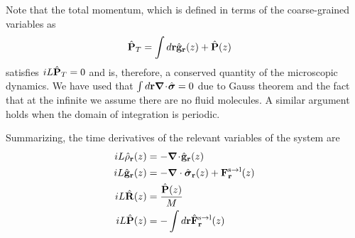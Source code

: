 \documentclass[b5paper,openright,11pt]{book}
\newcommand{\esc}{\!\cdot\!}
\begin{document}
Note  that the  total  momentum,  which is  defined  in  terms of  the
coarse-grained variables as
\begin{align}
  \hat{\bf P}_T&=\int d{\bf r} \hat{\bf g}_{\bf r}(z)+\hat{\bf P}(z)
\end{align}
satisfies $ iL\hat{\bf P}_T=0$ and is, therefore, a conserved quantity
of  the  microscopic   dynamics.   We  have  used   that  $\int  d{\bf
  r}\boldsymbol{\nabla}\esc\hat{\boldsymbol{\sigma}}=0$  due to  Gauss theorem  and the  fact
that at the infinite we assume there are no fluid molecules. A similar
argument holds when the domain of integration is periodic.


Summarizing, the time derivatives of the relevant variables of the system are
\begin{align}
    iL \hat{\rho}_{\bf r}(z) &= -\boldsymbol{\nabla}\esc\hat{\bf g}_{\bf r}(z)
\nonumber\\
iL\hat{\bf g}_{\bf r}(z)
&=-\boldsymbol{\nabla}\cdot \hat{\boldsymbol{\sigma}}_{\bf r}(z)+{\bf F}^{\rm s\to l}_{\bf r}(z) \nonumber \\
    iL\hat{\bf R}(z) &=\frac{\hat{\bf P}(z)}{M}
  \nonumber\\
    iL\hat{\bf P}(z) &=-\int  d{\bf r} \hat{\bf F}^{\rm s\to l}_{\bf r}(z)
   \label{timeDerivatives}  
\end{align}
\end{document}
